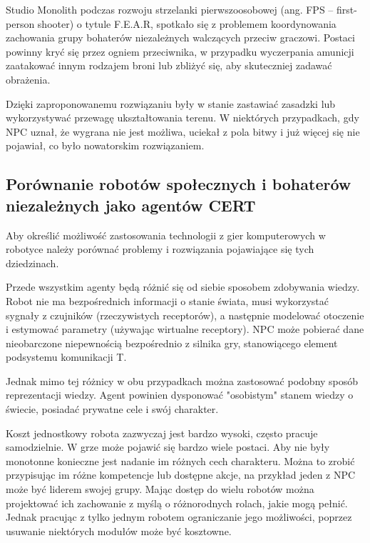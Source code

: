 Studio Monolith podczas rozwoju strzelanki pierwszoosobowej (ang. FPS – first-person shooter) o tytule F.E.A.R, spotkało się z problemem koordynowania zachowania grupy bohaterów niezależnych walczących przeciw graczowi. Postaci powinny kryć się przez ogniem przeciwnika, w przypadku wyczerpania amunicji zaatakować innym rodzajem broni lub zbliżyć się, aby skuteczniej zadawać obrażenia.

Dzięki zaproponowanemu rozwiązaniu były w stanie zastawiać zasadzki lub wykorzystywać przewagę ukształtowania terenu. W niektórych przypadkach, gdy NPC uznał, że wygrana nie jest możliwa, uciekał z pola bitwy i już więcej się nie pojawiał, co było nowatorskim rozwiązaniem.

\subsection{Porównanie robotów społecznych i bohaterów niezależnych jako agentów CERT}
Aby określić możliwość zastosowania technologii z gier komputerowych w robotyce należy porównać problemy i rozwiązania pojawiające się tych dziedzinach.

Przede wszystkim agenty będą różnić się od siebie sposobem zdobywania wiedzy. Robot nie ma bezpośrednich informacji o stanie świata, musi wykorzystać sygnały z czujników (rzeczywistych receptorów), a następnie modelować otoczenie i estymować parametry (używając wirtualne receptory). NPC może pobierać dane nieobarczone niepewnością bezpośrednio z silnika gry, stanowiącego element podsystemu komunikacji T. 

Jednak mimo tej różnicy w obu przypadkach można zastosować podobny sposób reprezentacji wiedzy. Agent powinien dysponować "osobistym" stanem wiedzy o świecie, posiadać prywatne cele i swój charakter. 

Koszt jednostkowy robota zazwyczaj jest bardzo wysoki, często pracuje samodzielnie. W grze może pojawić się bardzo wiele postaci. Aby nie były monotonne konieczne jest nadanie im różnych cech charakteru. Można to zrobić przypisując im różne kompetencje lub dostępne akcje, na przykład jeden z NPC może być liderem swojej grupy. Mając dostęp do wielu robotów można projektować ich zachowanie z myślą o różnorodnych rolach, jakie mogą pełnić. Jednak pracując z tylko jednym robotem ograniczanie jego możliwości, poprzez usuwanie niektórych modułów może być kosztowne.


